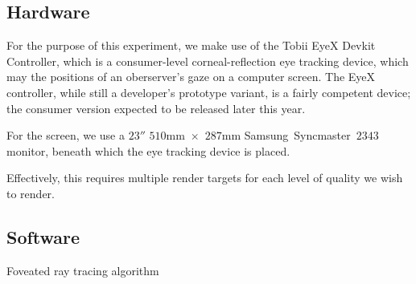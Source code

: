 \subsection{Hardware}
For the purpose of this experiment, we make use of the Tobii EyeX Devkit Controller, which is a consumer-level corneal-reflection eye tracking device, which may the positions of an oberserver's gaze on a computer screen.
The EyeX controller, while still a developer's prototype variant, is a fairly competent device; the consumer version expected to be released later this year.

For the screen, we use a $23''$ $510$mm~$\times$~$287$mm Samsung~Syncmaster~$2343$ monitor, beneath which the eye tracking device is placed.

Effectively, this requires multiple render targets for each level of quality we wish to render.

\subsection{Software}

\begin{algorithm}
\begin{algorithmic}[1]
\caption{Foveated ray tracing algorithm}\label{algfov}
\EndProcedure
\end{algorithmic}
\end{algorithm}




